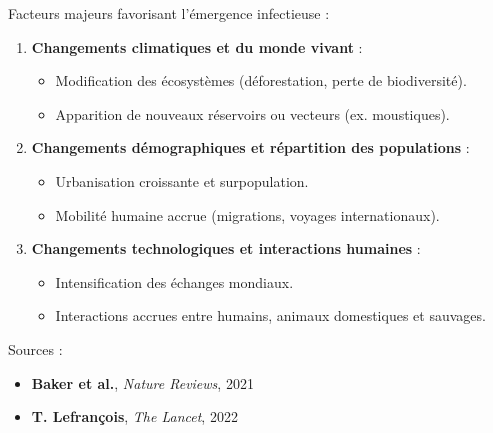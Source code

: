 \documentclass[
  ignorenonframetext,
]{beamer}
\providecommand{\tightlist}{%
  \setlength{\itemsep}{0pt}\setlength{\parskip}{0pt}}\usepackage{longtable,booktabs,array}
\begin{document}
\begin{frame}
\begin{block}{Facteurs majeurs favorisant l'émergence infectieuse :}
\protect\hypertarget{facteurs-majeurs-favorisant-luxe9mergence-infectieuse}{}
\begin{enumerate}
\tightlist
\item
  \textbf{Changements climatiques et du monde vivant} :

  \begin{itemize}
  \tightlist
  \item
    Modification des écosystèmes (déforestation, perte de
    biodiversité).\\
  \item
    Apparition de nouveaux réservoirs ou vecteurs (ex. moustiques).
  \end{itemize}
\item
  \textbf{Changements démographiques et répartition des populations} :

  \begin{itemize}
  \tightlist
  \item
    Urbanisation croissante et surpopulation.\\
  \item
    Mobilité humaine accrue (migrations, voyages internationaux).
  \end{itemize}
\item
  \textbf{Changements technologiques et interactions humaines} :

  \begin{itemize}
  \tightlist
  \item
    Intensification des échanges mondiaux.\\
  \item
    Interactions accrues entre humains, animaux domestiques et sauvages.
  \end{itemize}
\end{enumerate}
\end{block}

\begin{block}{Sources :}
\protect\hypertarget{sources}{}
\begin{itemize}
\tightlist
\item
  \textbf{Baker et al.}, \emph{Nature Reviews}, 2021\\
\item
  \textbf{T. Lefrançois}, \emph{The Lancet}, 2022
\end{itemize}
\end{block}
\end{frame}
\end{document}
